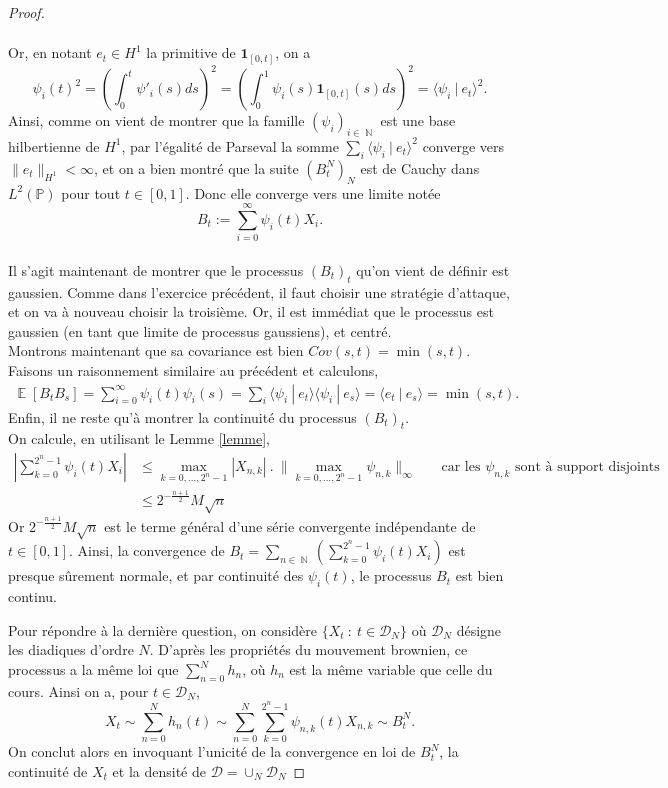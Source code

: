 \documentclass{article}
\theoremstyle{definition}
\numberwithin{equation}{section}
\DeclareMathOperator{\N}{\mathbb{N}}
\DeclareMathOperator{\E}{\mathbb{E}}
\begin{document}
\begin{proof}
\begin{itemize}
\begin{align*}
    \end{align*}
    Or, en notant $e_t \in H^1$ la primitive de $\mathbf{1}_{[0,t]}$, on a
    $$ \psi_i(t)^2=\left(\int_0^t\psi'_i(s)ds\right)^2=\left( \int_0^1 \psi_i(s)\mathbf{1}_{[0,t]}(s)ds \right)^2 = \langle \psi_i ~|~e_t\rangle^2. $$
    Ainsi, comme on vient de montrer que la famille $(\psi_i)_{i\in\N}$ est une base hilbertienne de $H^1$, par l'égalité de Parseval la somme $\sum_i \langle \psi_i~|~e_t\rangle^2$ converge vers $\|e_t\|_{H^1}<\infty$, et on a bien montré que la suite $(B_t^N)_N$ est de Cauchy dans $L^2(\mathbb{P})$ pour tout $t\in[0,1]$. Donc elle converge vers une limite notée 
    $$B_t:=\sum_{i=0}^\infty \psi_i(t)X_i.$$\\
    Il s'agit maintenant de montrer que le processus $(B_t)_t$ qu'on vient de définir est gaussien. Comme dans l'exercice précédent, il faut choisir une stratégie d'attaque, et on va à nouveau choisir la troisième. Or, il est immédiat que le processus est gaussien (en tant que limite de processus gaussiens), et centré.\\
    Montrons maintenant que sa covariance est bien $Cov(s,t)=\min(s,t)$. Faisons un raisonnement similaire au précédent et calculons,
    \begin{align*}
        \E[B_tB_s]=\sum_{i=0}^\infty \psi_i(t)\psi_i(s) = \sum_i \langle\psi_i~|~e_t\rangle\langle\psi_i~|~e_s\rangle = \langle     e_t~|~e_s\rangle = \min(s,t).
    \end{align*}
    Enfin, il ne reste qu'à montrer la continuité du processus $(B_t)_t$.\\
    On calcule, en utilisant le Lemme \ref{lemme},
    \begin{align*}
        \left|\sum_{k=0}^{2^n-1}\psi_i(t)X_i\right| &\leq \max_{k=0,\dots,2^n-1} |X_{n,k}|~.~ \|\max_{k=0,\dots,2^n-1} \psi_{n,k}\|_\infty ~~~~~~~~\text{car les $\psi_{n,k}$ sont à support disjoints}\\
        &\leq  2^{-\frac{n+1}{2}} M\sqrt{n}
    \end{align*}
    Or $2^{-\frac{n+1}{2}} M\sqrt{n}$ est le terme général d'une série convergente indépendante de $t\in[0,1]$. Ainsi, la convergence de $B_t=\sum_{n\in\N}  \left(\sum_{k=0}^{2^n-1}\psi_i(t)X_i\right) $ est presque sûrement normale, et par continuité des $\psi_i(t)$, le processus $B_t$ est bien continu.
\end{itemize}
Pour répondre à la dernière question, on considère $\{X_t~:~t\in \mathcal{D}_N\}$ où $\mathcal{D}_N$ désigne les diadiques d'ordre $N$. D'après les propriétés du mouvement brownien, ce processus a la même loi que $\sum_{n=0}^N h_n$, où $h_n$ est la même variable que celle du cours. Ainsi on a, pour $t\in\mathcal{D}_N$,
$$ X_t \sim \sum_{n=0}^N h_n(t) \sim \sum_{n=0}^N \sum_{k=0}^{2^n-1} \psi_{n,k}(t)X_{n,k} \sim B_t^N. $$
On conclut alors en invoquant l'unicité de la convergence en loi de $B_t^N$, la continuité de $X_t$ et la densité de $\mathcal{D}=\cup_N \mathcal{D}_N$
\end{proof}
\end{document}
